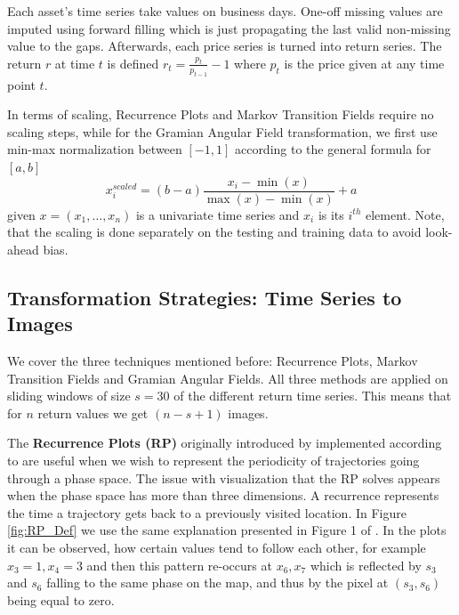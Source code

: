 \documentclass[12pt, a4paper]{article}
\begin{document}
Each asset's time series take values on business days. One-off missing values are imputed using forward filling which is just propagating the last valid non-missing value to the gaps. Afterwards, each price series is turned into return series. The return $r$ at time $t$ is defined $r_t = \frac{p_t}{p_{t-1}}-1$ where $p_t$ is the price given at any time point $t$.

In terms of scaling, Recurrence Plots and Markov Transition Fields require no scaling steps, while for the Gramian Angular Field transformation, we first use min-max normalization between $[-1, 1]$ according to the general formula for $[a, b]$
\begin{equation}
\label{eq:minmax}
    x^{scaled}_i =(b-a)\frac{x_i-\min(x)}{\max(x) - \min(x)} + a
\end{equation}
given $x = (x_1, \dots, x_n)$ is a univariate time series and $x_i$ is its $i^{th}$ element. Note, that the scaling is done separately on the testing and training data to avoid look-ahead bias.

\subsection{Transformation Strategies: Time Series to Images}
\label{subsec:DM:TS2IM}

We cover the three techniques mentioned before: Recurrence Plots, Markov Transition Fields and Gramian Angular Fields. All three methods are applied on sliding windows of size $s = 30$ of the different return time series. This means that for $n$ return values we get $(n - s + 1)$ images. 

The \textbf{Recurrence Plots (RP)} originally introduced by \cite{jp1987recurrence} implemented according to \cite{hatami2018classification} are useful when we wish to represent the periodicity of trajectories going through a phase space. The issue with visualization that the RP solves appears when the phase space has more than three dimensions. A recurrence represents the time a trajectory gets back to a previously visited location. In Figure \ref{fig:RP_Def} we use the same explanation presented in Figure 1 of \cite{hatami2018classification}. In the plots it can be observed, how certain values tend to follow each other, for example $x_3 = 1, x_4 = 3$ and then this pattern re-occurs at $x_6, x_7$ which is reflected by $s_3$ and $s_6$ falling to the same phase on the map, and thus by the pixel at $(s_3, s_6)$ being equal to zero.
\end{document}

